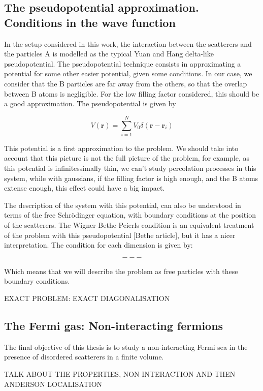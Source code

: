 \subsection{The pseudopotential approximation. Conditions in the wave function}

In the setup considered in this work, the interaction between the scatterers and the particles A is modelled as the typical Yuan and Hang delta-like pseudopotential. The pseudopotential technique consists in approximating a potential for some other easier potential, given some conditions. In our case, we consider that the B particles are far away from the others, so that the overlap between B atoms is negligible. For the low filling factor considered, this should be a good approximation. The pseudopotential is given by

\begin{equation} %
    V(\mathbf{r}) = \sum_{i=1}^{N} V_{0} \delta(\mathbf{r} - \mathbf{r}_{i})
\end{equation}

This potential is a first approximation to the problem. We should take into account that this picture is not the full picture of the problem, for example, as this potential is infinitessimally thin, we can't study percolation processes in this system, while with gaussians, if the filling factor is high enough, and the B atoms extense enough, this effect could have a big impact.

The description of the system with this potential, can also be understood in terms of the free Schrödinger equation, with boundary conditions at the position of the scatterers. The Wigner-Bethe-Peierls condition is an equivalent treatment of the problem with this pseudopotential [Bethe article], but it has a nicer interpretation. The condition for each dimension is given by:

\begin{equation} %
    ---
\end{equation}

Which means that we will describe the problem as free particles with these boundary conditions.

EXACT PROBLEM: EXACT DIAGONALISATION 

\subsection{The Fermi gas: Non-interacting fermions}

The final objective of this thesis is to study a non-interacting Fermi sea in the presence of disordered scatterers in a finite volume. 

TALK ABOUT THE PROPERTIES, NON INTERACTION AND THEN ANDERSON LOCALISATION